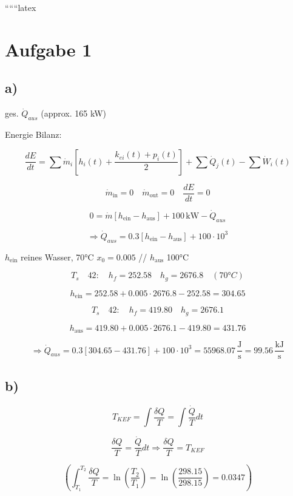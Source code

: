 
``````latex


\section*{Aufgabe 1}

\subsection*{a)}

ges. $\dot{Q}_{aus}$ \hfill (approx. 165 kW)

Energie Bilanz:

\[
\frac{dE}{dt} = \sum \dot{m}_i \left[ h_i(t) + \frac{k_{ei}(t) + p_i(t)}{2} \right] + \sum \dot{Q}_j(t) - \sum \dot{W}_i(t)
\]

\[
\dot{m}_{\text{in}} = 0 \quad \dot{m}_{\text{out}} = 0 \quad \frac{dE}{dt} = 0
\]

\[
0 = \dot{m} \left[ h_{\text{ein}} - h_{\text{aus}} \right] + 100 \, \text{kW} - \dot{Q}_{aus}
\]

\[
\Rightarrow \dot{Q}_{aus} = 0.3 \left[ h_{\text{ein}} - h_{\text{aus}} \right] + 100 \cdot 10^3
\]

$h_{\text{ein}}$ reines Wasser, 70°C \quad $x_0 = 0.005$ \quad // $h_{\text{aus}}$ 100°C

\[
T_s \quad 42: \quad h_f = 252.58 \quad h_g = 2676.8 \quad (70°C)
\]

\[
h_{\text{ein}} = 252.58 + 0.005 \cdot 2676.8 - 252.58 = 304.65
\]

\[
T_s \quad 42: \quad h_f = 419.80 \quad h_g = 2676.1
\]

\[
h_{\text{aus}} = 419.80 + 0.005 \cdot 2676.1 - 419.80 = 431.76
\]

\[
\Rightarrow \dot{Q}_{aus} = 0.3 \left[ 304.65 - 431.76 \right] + 100 \cdot 10^3 = 55968.07 \, \frac{\text{J}}{\text{s}} = 99.56 \, \frac{\text{kJ}}{\text{s}}
\]

\subsection*{b)}

\[
T_{KEF} = \int \frac{\delta Q}{T} = \int \frac{\dot{Q}}{T} dt
\]

\[
\frac{\delta Q}{T} = \frac{\dot{Q}}{T} dt \Rightarrow \frac{\delta Q}{T} = T_{KEF}
\]

\[
\left( \int_{T_1}^{T_2} \frac{\delta Q}{T} = \ln \left( \frac{T_2}{T_1} \right) = \ln \left( \frac{298.15}{298.15} \right) = 0.0347 \right)
\]

